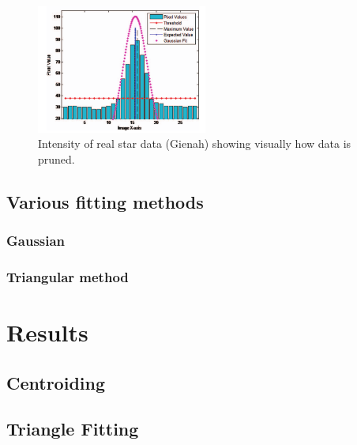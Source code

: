 \documentclass[aps,pra,a4paper,nofootinbib,onecolumn,tightenlines,longbibliography,12pt,amsfonts,amssymb,amsmath,floatfix]{revtex4-2} %
\begin{document}
    \begin{figure}[H]
      \begin{center}
        \includegraphics[width=0.5\textwidth]{litreview.png}
      \end{center}
      \caption{Intensity of real star data (Gienah) showing visually how data is pruned. \cite{rawashdeh2014image}}
      \label{fig:1}
    \end{figure}
  
  
  \subsection{Various fitting methods} %
  \label{sub:Various fitting methods}
  
    \subsubsection{Gaussian} %
    \label{ssub:Gaussian}

    
    \subsubsection{Triangular method} %
    \label{ssub:Triangular method}
  
    

\section{Results} %
\label{sec:Results}

  \subsection{Centroiding} %
  \label{sub:Centroiding_results}
  
  \subsection{Triangle Fitting} %
  \label{sub:Triangle Fitting}
  
\end{document}
